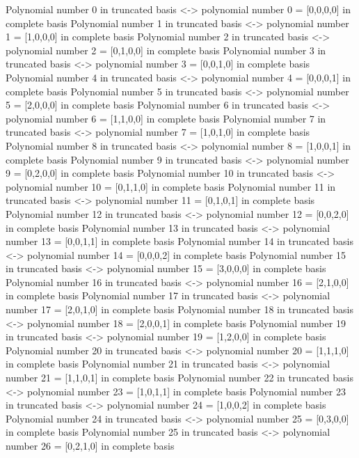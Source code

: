 Polynomial number  0  in truncated basis <-> polynomial number  0  =  [0,0,0,0]  in complete basis
Polynomial number  1  in truncated basis <-> polynomial number  1  =  [1,0,0,0]  in complete basis
Polynomial number  2  in truncated basis <-> polynomial number  2  =  [0,1,0,0]  in complete basis
Polynomial number  3  in truncated basis <-> polynomial number  3  =  [0,0,1,0]  in complete basis
Polynomial number  4  in truncated basis <-> polynomial number  4  =  [0,0,0,1]  in complete basis
Polynomial number  5  in truncated basis <-> polynomial number  5  =  [2,0,0,0]  in complete basis
Polynomial number  6  in truncated basis <-> polynomial number  6  =  [1,1,0,0]  in complete basis
Polynomial number  7  in truncated basis <-> polynomial number  7  =  [1,0,1,0]  in complete basis
Polynomial number  8  in truncated basis <-> polynomial number  8  =  [1,0,0,1]  in complete basis
Polynomial number  9  in truncated basis <-> polynomial number  9  =  [0,2,0,0]  in complete basis
Polynomial number  10  in truncated basis <-> polynomial number  10  =  [0,1,1,0]  in complete basis
Polynomial number  11  in truncated basis <-> polynomial number  11  =  [0,1,0,1]  in complete basis
Polynomial number  12  in truncated basis <-> polynomial number  12  =  [0,0,2,0]  in complete basis
Polynomial number  13  in truncated basis <-> polynomial number  13  =  [0,0,1,1]  in complete basis
Polynomial number  14  in truncated basis <-> polynomial number  14  =  [0,0,0,2]  in complete basis
Polynomial number  15  in truncated basis <-> polynomial number  15  =  [3,0,0,0]  in complete basis
Polynomial number  16  in truncated basis <-> polynomial number  16  =  [2,1,0,0]  in complete basis
Polynomial number  17  in truncated basis <-> polynomial number  17  =  [2,0,1,0]  in complete basis
Polynomial number  18  in truncated basis <-> polynomial number  18  =  [2,0,0,1]  in complete basis
Polynomial number  19  in truncated basis <-> polynomial number  19  =  [1,2,0,0]  in complete basis
Polynomial number  20  in truncated basis <-> polynomial number  20  =  [1,1,1,0]  in complete basis
Polynomial number  21  in truncated basis <-> polynomial number  21  =  [1,1,0,1]  in complete basis
Polynomial number  22  in truncated basis <-> polynomial number  23  =  [1,0,1,1]  in complete basis
Polynomial number  23  in truncated basis <-> polynomial number  24  =  [1,0,0,2]  in complete basis
Polynomial number  24  in truncated basis <-> polynomial number  25  =  [0,3,0,0]  in complete basis
Polynomial number  25  in truncated basis <-> polynomial number  26  =  [0,2,1,0]  in complete basis
